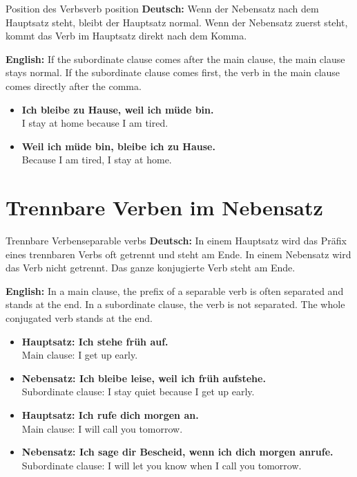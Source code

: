 \documentclass[a4paper,11pt]{article}
\newcommand{\GermanText}[1]{\textbf{Deutsch: }#1\par}
\newcommand{\EnglishText}[1]{{\small\color{SoftGray}\textbf{English: }#1\par}}
\newcommand{\ExampleItem}[2]{\item \textbf{#1}\\{\small\color{SoftGray}#2}}
\begin{document}
        \begin{grammarentry}{Position des Verbs}{verb position}
            \GermanText{Wenn der Nebensatz nach dem Hauptsatz steht, bleibt der Hauptsatz normal. Wenn der Nebensatz zuerst steht, kommt das Verb im Hauptsatz direkt nach dem Komma.}
            \EnglishText{If the subordinate clause comes after the main clause, the main clause stays normal. If the subordinate clause comes first, the verb in the main clause comes directly after the comma.}
            
            \begin{exbox}
                \begin{itemize}
                    \ExampleItem{Ich bleibe zu Hause, weil ich müde bin.}{I stay at home because I am tired.}
                    \ExampleItem{Weil ich müde bin, bleibe ich zu Hause.}{Because I am tired, I stay at home.}
                \end{itemize}
            \end{exbox}
        \end{grammarentry}


    \section{Trennbare Verben im Nebensatz}
        
        \begin{grammarentry}{Trennbare Verben}{separable verbs}
            \GermanText{In einem Hauptsatz wird das Präfix eines trennbaren Verbs oft getrennt und steht am Ende. In einem Nebensatz wird das Verb nicht getrennt. Das ganze konjugierte Verb steht am Ende.}
            \EnglishText{In a main clause, the prefix of a separable verb is often separated and stands at the end. In a subordinate clause, the verb is not separated. The whole conjugated verb stands at the end.}
            
            \begin{exbox}
                \begin{itemize}
                    \ExampleItem{Hauptsatz: Ich stehe früh auf.}{Main clause: I get up early.}
                    \ExampleItem{Nebensatz: Ich bleibe leise, weil ich früh aufstehe.}{Subordinate clause: I stay quiet because I get up early.}
                    \ExampleItem{Hauptsatz: Ich rufe dich morgen an.}{Main clause: I will call you tomorrow.}
                    \ExampleItem{Nebensatz: Ich sage dir Bescheid, wenn ich dich morgen anrufe.}{Subordinate clause: I will let you know when I call you tomorrow.}
                \end{itemize}
            \end{exbox}
        \end{grammarentry}
        
\end{document}
